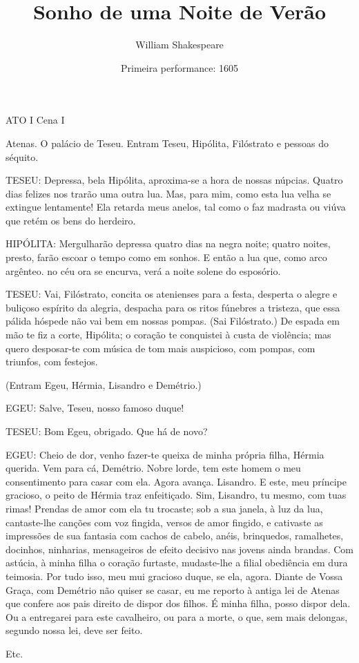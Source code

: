 \documentclass[a4paper,twoside]{memoir}
\title{Sonho de uma Noite de Verão}
\author{William Shakespeare}
\date{Primeira performance: 1605}
\begin{document}
\frenchspacing

\maketitle

ATO I
Cena I

Atenas. O palácio de Teseu. Entram Teseu, Hipólita, Filóstrato e pessoas do
séquito.

TESEU: Depressa, bela Hipólita, aproxima-se a hora de nossas núpcias. Quatro
dias felizes nos trarão uma outra lua. Mas, para mim, como esta lua velha se
extingue lentamente! Ela retarda meus anelos, tal como o faz madrasta ou viúva
que retém os bens do herdeiro.

HIPÓLITA: Mergulharão depressa quatro dias na negra noite; quatro noites,
presto, farão escoar o tempo como em sonhos. E então a lua que, como arco
argênteo. no céu ora se encurva, verá a noite solene do esposório.

TESEU: Vai, Filóstrato, concita os atenienses para a festa, desperta o alegre
e buliçoso espírito da alegria, despacha para os ritos fúnebres a tristeza, que
essa pálida hóspede não vai bem em nossas pompas. (Sai Filóstrato.) De espada
em mão te fiz a corte, Hipólita; o coração te conquistei à custa de violência;
mas quero desposar-te com música de tom mais auspicioso, com pompas, com
triunfos, com festejos.

(Entram Egeu, Hérmia, Lisandro e Demétrio.)

EGEU: Salve, Teseu, nosso famoso duque!

TESEU: Bom Egeu, obrigado. Que há de novo?

EGEU: Cheio de dor, venho fazer-te queixa de minha própria filha, Hérmia
querida. Vem para cá, Demétrio. Nobre lorde, tem este homem o meu consentimento
para casar com ela. Agora avança. Lisandro. E este, meu príncipe gracioso, o
peito de Hérmia traz enfeitiçado. Sim, Lisandro, tu mesmo, com tuas rimas!
Prendas de amor com ela tu trocaste; sob a sua janela, à luz da lua,
cantaste-lhe canções com voz fingida, versos de amor fingido, e cativaste as
impressões de sua fantasia com cachos de cabelo, anéis, brinquedos, ramalhetes,
docinhos, ninharias, mensageiros de efeito decisivo nas jovens ainda brandas.
Com astúcia, à minha filha o coração furtaste, mudaste-lhe a filial obediência
em dura teimosia. Por tudo isso, meu mui gracioso duque, se ela, agora. Diante
de Vossa Graça, com Demétrio não quiser se casar, eu me reporto à antiga lei de
Atenas que confere aos pais direito de dispor dos filhos. É minha filha, posso
dispor dela. Ou a entregarei para este cavalheiro, ou para a morte, o que, sem
mais delongas, segundo nossa lei, deve ser feito.

Etc.
\end{document}
